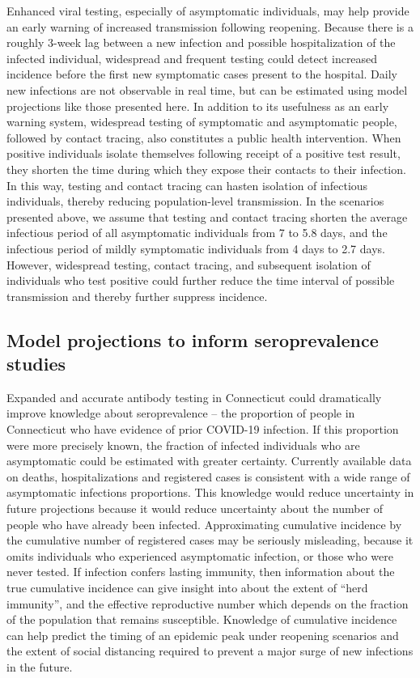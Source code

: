 \documentclass[11pt]{article}
\begin{document}
Enhanced viral testing, especially of asymptomatic individuals, may help provide an early warning of increased transmission following reopening.  Because there is a roughly 3-week lag between a new infection and possible hospitalization of the infected individual, widespread and frequent testing could detect increased incidence before the first new symptomatic cases present to the hospital.  Daily new infections are not observable in real time, but can be estimated using model projections like those presented here.  In addition to its usefulness as an early warning system, widespread testing of symptomatic and asymptomatic people, followed by contact tracing, also constitutes a public health intervention. When positive individuals isolate themselves following receipt of a positive test result, they shorten the time during which they expose their contacts to their infection. In this way, testing and contact tracing can hasten isolation of infectious individuals, thereby reducing population-level transmission.  In the scenarios presented above, we assume that testing and contact tracing shorten the average infectious period of all asymptomatic individuals from 7 to 5.8 days, and the infectious period of mildly symptomatic individuals from 4 days to 2.7 days. However, widespread testing, contact tracing, and subsequent isolation of individuals who test positive could further reduce the time interval of possible transmission and thereby further suppress incidence.

\subsection*{Model projections to inform seroprevalence studies}

Expanded and accurate antibody testing in Connecticut could dramatically improve knowledge about seroprevalence -- the proportion of people in Connecticut who have evidence of prior COVID-19 infection. If this proportion were more precisely known, the fraction of infected individuals who are asymptomatic could be estimated with greater certainty.  Currently available data on deaths, hospitalizations and registered cases is consistent with a wide range of asymptomatic infections proportions.  This knowledge would reduce uncertainty in future projections because it would reduce uncertainty about the number of people who have already been infected.  Approximating cumulative incidence by the cumulative number of registered cases may be seriously misleading, because it omits individuals who experienced asymptomatic infection, or those who were never tested.  If infection confers lasting immunity, then information about the true cumulative incidence can give insight into about the extent of ``herd immunity'', and the effective reproductive number which depends on the fraction of the population that remains susceptible. Knowledge of cumulative incidence can help predict the timing of an epidemic peak under reopening scenarios and the extent of social distancing required to prevent a major surge of new infections in the future. 
\end{document}
